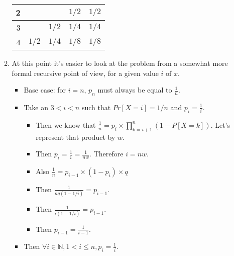 \documentclass{article}
\begin{document}
\begin{enumerate}
\begin{enumerate}
\begin{center}
\begin{tabular}{ r || c | c | c | c }
            2 &       &       & $1/2$ & $1/2$ \\ \hline
            3 &       & $1/2$ & $1/4$ & $1/4$ \\ \hline
            4 & $1/2$ & $1/4$ & $1/8$ & $1/8$ \\
        \end{tabular}
        \end{center}
    \item At this point it's easier to look at the problem from a somewhat more formal recursive point of view, for a given value $i$ of $x$.
        \begin{itemize}
        \item Base case: for $i = n$, $p_n$ must always be equal to $\frac{1}{n}$.
        \item Take an $3 < i < n$ such that $Pr[X = i] = 1 / n$ and $p_i = \frac{1}{i}$.
            \begin{itemize}
            \item Then we know that $\frac{1}{n} = p_i \times \prod_{k = i + 1}^n (1 - P[X = k])$. Let's represent that product by $w$.
            \item Then $p_i = \frac{1}{i} = \frac{1}{nw}$. Therefore $i = nw$.
            \item Also $\frac{1}{n} = p_{i - 1} \times (1 - p_i) \times q$
            \item Then $\frac{1}{nq(1 - 1 / i)} = p_{i - 1}$.
            \item Then $\frac{1}{i(1 - 1 / i)} = p_{i - 1}$.
            \item Then $p_{i - 1} = \frac{1}{i - 1}$.
            \end{itemize}
        \item Then $\forall i \in \mathbb{N}, 1 < i \leq n, p_i = \frac{1}{i}$.
        \end{itemize}
    \end{enumerate}


\end{enumerate}
\end{document}
